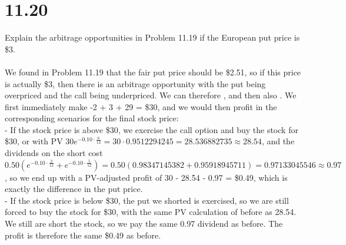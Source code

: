\documentclass{article}
\begin{document}
{\Large 

\section*{11.20}
Explain the arbitrage opportunities in Problem 11.19 if the European put price is \$3. \\ \\
We found in Problem 11.19 that the fair put price should be \$2.51, so if this price is actually \$3, then there is an arbitrage opportunity with the put being overpriced and the call being underpriced. We can therefore , and then also . We first immediately make -2 + 3 + 29 = \$30, and we would then profit in the corresponding scenarios for the final stock price: \\
- If the stock price is above \$30, we exercise the call option and buy the stock for \$30, or with PV \(30e^{-0.10 \cdot \frac{6}{12}} = 30 \cdot 0.9512294245 = 28.536882735 \approx 28.54\), and the dividends on the short cost \(0.50(e^{-0.10 \cdot \frac{2}{12}} + e^{-0.10 \cdot \frac{5}{12}}) = 0.50(0.98347145382 + 0.95918945711) = 0.97133045546 \approx 0.97\), so we end up with a PV-adjusted profit of 30 - 28.54 - 0.97 = \$0.49, which is exactly the difference in the put price. \\
- If the stock price is below \$30, the put we shorted is exercised, so we are still forced to buy the stock for \$30, with the same PV calculation of before as 28.54. We still are short the stock, so we pay the same 0.97 dividend as before. The profit is therefore the same \$0.49 as before. 

}
\end{document}
